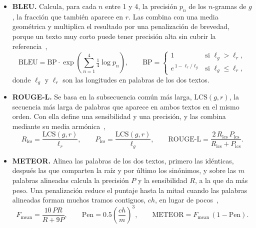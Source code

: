 \begin{itemize}
    \item \textbf{BLEU.} Calcula, para cada $n$ entre 1 y 4, la precisión $p_n$ de los $n$-gramas de $g$, la
    fracción que también aparece en $r$. Las combina con una media geométrica y multiplica el resultado por una
    penalización de brevedad, porque un texto muy corto puede tener precisión alta sin cubrir la
    referencia~\cite{papineni2002bleu},
    \begin{equation}
        \mathrm{BLEU} = \mathrm{BP}\cdot\exp\!\left(\sum_{n=1}^{4} \tfrac{1}{4}\log p_n\right), \qquad
        \mathrm{BP} =
        \begin{cases}
            1 & \text{si } \ell_g > \ell_r,\\
            e^{\,1 - \ell_r/\ell_g} & \text{si } \ell_g \le \ell_r,
        \end{cases}
        \label{eq:marco_bleu}
    \end{equation}
    donde $\ell_g$ y $\ell_r$ son las longitudes en palabras de los dos textos.

    \item \textbf{ROUGE-L.} Se basa en la subsecuencia común más larga, $\mathrm{LCS}(g, r)$, la secuencia más
    larga de palabras que aparece en ambos textos en el mismo orden. Con ella define una sensibilidad y una
    precisión, y las combina mediante su media armónica~\cite{lin2004rouge},
    \begin{equation}
        R_{\mathrm{lcs}} = \frac{\mathrm{LCS}(g, r)}{\ell_r}, \qquad
        P_{\mathrm{lcs}} = \frac{\mathrm{LCS}(g, r)}{\ell_g}, \qquad
        \text{ROUGE-L} = \frac{2\,R_{\mathrm{lcs}}\,P_{\mathrm{lcs}}}{R_{\mathrm{lcs}} + P_{\mathrm{lcs}}}.
        \label{eq:marco_rouge}
    \end{equation}

    \item \textbf{METEOR.} Alinea las palabras de los dos textos, primero las idénticas, después las que
    comparten la raíz y por último los sinónimos, y sobre las $m$ palabras alineadas calcula la precisión $P$ y
    la sensibilidad $R$, a la que da más peso. Una penalización reduce el puntaje hasta la mitad cuando las
    palabras alineadas forman muchos tramos contiguos, $ch$, en lugar de pocos~\cite{banerjee2005meteor},
    \begin{equation}
        F_{\text{mean}} = \frac{10\,P R}{R + 9P}, \qquad
        \mathrm{Pen} = 0.5\left(\frac{ch}{m}\right)^{3}, \qquad
        \mathrm{METEOR} = F_{\text{mean}}\,(1 - \mathrm{Pen}).
        \label{eq:marco_meteor}
    \end{equation}


\end{itemize}
